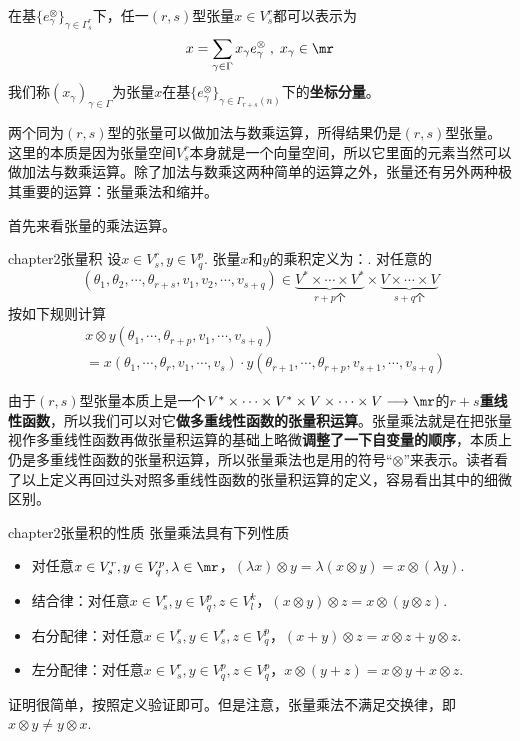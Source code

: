在基$\{ e^{\otimes}_{\gamma}\}_{\gamma\in \Gamma^{r}_{s}}$下，任一$(r,s)$型张量$x\in V^{r}_{s} $都可以表示为
\[
x=\sum_{\gamma\in \Gamma}x_{\gamma}e^{\otimes}_{\gamma}\;,\;x_{\gamma}\in \mr
\]
我们称$\left(x_{\gamma} \right)_{\gamma\in\Gamma}$为张量$x$在基$\{ e^{\otimes}_{\gamma}\}_{\gamma\in \Gamma_{r+s}(n)}$下的\textbf{坐标分量}。

两个同为$(r,s)$型的张量可以做加法与数乘运算，所得结果仍是$(r,s)$型张量。这里的本质是因为张量空间$V^{r}_{s}$本身就是一个向量空间，所以它里面的元素当然可以做加法与数乘运算。除了加法与数乘这两种简单的运算之外，张量还有另外两种极其重要的运算：张量乘法和缩并。

首先来看张量的乘法运算。
\begin{mydef}{}{chapter2张量积}
	设$x\in V^{r}_{s},y\in V^{p}_{q}$. 张量$x$和$y$的乘积定义为：{}. 对任意的
	\[
	(\theta_{1},\theta_{2},\cdots,\theta_{r+s},v_{1},v_{2},\cdots,v_{s+q})\in\underbrace{ V^{\ast}\times \cdots\times V^{\ast}}_{r+p\text{个}}\times \underbrace{V\times\cdots\times V}_{s+q\text{个}}
	\]
	按如下规则计算
	\[
	\begin{split}
	&x\otimes y(\theta_{1},\cdots,\theta_{r+p},v_{1},\cdots,v_{s+q})\\
	&= x(\theta_{1},\cdots,\theta_{r},v_{1},\cdots,v_{s })\cdot y(\theta_{r+1},\cdots,\theta_{r+p},v_{s +1},\cdots,v_{s+q})
	\end{split}
	\]
\end{mydef}

由于$(r,s)$型张量本质上是一个$V^{\ast}\times\cdots\times V^{\ast}\times V\times\cdots \times V\longrightarrow \mr$的\textbf{$r+s$重线性函数}，所以我们可以对它\textbf{做多重线性函数的张量积运算}。张量乘法就是在把张量视作多重线性函数再做张量积运算的基础上略微\textbf{调整了一下自变量的顺序}，本质上仍是多重线性函数的张量积运算，所以张量乘法也是用的符号“$\otimes$”来表示。读者看了以上定义再回过头对照多重线性函数的张量积运算的定义，容易看出其中的细微区别。      
       
\begin{mythm}{}{chapter2张量积的性质}
	张量乘法具有下列性质
	\begin{itemize}
		\item 对任意$x\in V^{r}_{s},y\in V^{p}_{q},\lambda\in \mr$，$(\lambda x)\otimes y=\lambda(x\otimes y)=x\otimes (\lambda y)$.
		\item 结合律：对任意$x\in V^{r}_{s },y\in V^{p}_{q},z\in V^{k}_{l}$，$(x\otimes y)\otimes z=x\otimes (y\otimes z)$.
		\item 右分配律：对任意$x\in V^{r }_{s },y\in V^{r }_{s },z\in V^{p}_{q}$，$(x+y)\otimes z=x\otimes z+y\otimes z$.
		\item 左分配律：对任意$x\in V^{r }_{s },y\in V^{p}_{q},z\in V^{p}_{q}$，$x\otimes (y+z)=x\otimes y+x\otimes z$.
	\end{itemize}
\end{mythm}
证明很简单，按照定义验证即可。但是注意，张量乘法不满足交换律，即$x\otimes y\neq y\otimes x$.

